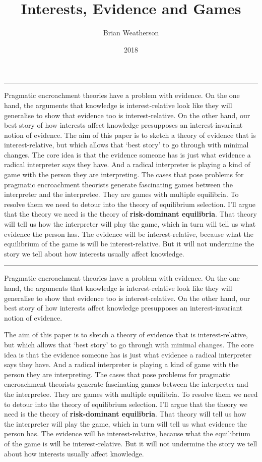 \documentclass[
  10pt,
  letterpaper,
  DIV=11,
  numbers=noendperiod,
  twoside]{scrartcl}
\title{Interests, Evidence and Games}
\author{Brian Weatherson}
\date{2018}
\renewenvironment{abstract}
 {\vspace{-1.25cm}
 \quotation\small\noindent\rule{\linewidth}{.5pt}\par\smallskip
 \noindent }
 {\par\noindent\rule{\linewidth}{.5pt}\endquotation}
\begin{document}
\maketitle
\begin{abstract}
Pragmatic encroachment theories have a problem with evidence. On the one
hand, the arguments that knowledge is interest-relative look like they
will generalise to show that evidence too is interest-relative. On the
other hand, our best story of how interests affect knowledge presupposes
an interest-invariant notion of evidence. The aim of this paper is to
sketch a theory of evidence that is interest-relative, but which allows
that `best story' to go through with minimal changes. The core idea is
that the evidence someone has is just what evidence a radical
interpreter says they have. And a radical interpreter is playing a kind
of game with the person they are interpreting. The cases that pose
problems for pragmatic encroachment theorists generate fascinating games
between the interpreter and the interpretee. They are games with
multiple equilibria. To resolve them we need to detour into the theory
of equilibrium selection. I'll argue that the theory we need is the
theory of \textbf{risk-dominant equilibria}. That theory will tell us
how the interpreter will play the game, which in turn will tell us what
evidence the person has. The evidence will be interest-relative, because
what the equilibrium of the game is will be interest-relative. But it
will not undermine the story we tell about how interests usually affect
knowledge.
\end{abstract}


Pragmatic encroachment theories have a problem with evidence. On the one
hand, the arguments that knowledge is interest-relative look like they
will generalise to show that evidence too is interest-relative. On the
other hand, our best story of how interests affect knowledge presupposes
an interest-invariant notion of evidence.

The aim of this paper is to sketch a theory of evidence that is
interest-relative, but which allows that `best story' to go through with
minimal changes. The core idea is that the evidence someone has is just
what evidence a radical interpreter says they have. And a radical
interpreter is playing a kind of game with the person they are
interpreting. The cases that pose problems for pragmatic encroachment
theorists generate fascinating games between the interpreter and the
interpretee. They are games with multiple equilibria. To resolve them we
need to detour into the theory of equilibrium selection. I'll argue that
the theory we need is the theory of \textbf{risk-dominant equilibria}.
That theory will tell us how the interpreter will play the game, which
in turn will tell us what evidence the person has. The evidence will be
interest-relative, because what the equilibrium of the game is will be
interest-relative. But it will not undermine the story we tell about how
interests usually affect knowledge.
\end{document}
